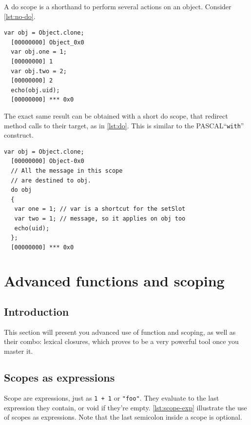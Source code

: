 \documentclass[openright,twoside,12pt]{report}
\newcommand{\pascal}{PASCAL\xspace}
\newcommand{\lst}[1]{\autoref{lst:#1}}
\begin{document}
A do scope is a shorthand to perform several actions on an
object. Consider \lst{no-do}.

\begin{lstlisting}[caption=Lot of code bloat,label=lst:no-do]
  var obj = Object.clone;
  [00000000] Object_0x0
  var obj.one = 1;
  [00000000] 1
  var obj.two = 2;
  [00000000] 2
  echo(obj.uid);
  [00000000] *** 0x0
\end{lstlisting}

The exact same result can be obtained with a short do scope, that
redirect method calls to their target, as in \lst{do}. This is similar
to the \pascal ``\texttt{with}'' construct.


\begin{lstlisting}[caption=Shorter with a do block,label=lst:do]
  var obj = Object.clone;
  [00000000] Object-0x0
  // All the message in this scope
  // are destined to obj.
  do obj
  {
   var one = 1; // var is a shortcut for the setSlot
   var two = 1; // message, so it applies on obj too
   echo(uid);
  };
  [00000000] *** 0x0
\end{lstlisting}



\chapter{Advanced functions and scoping}

\section{Introduction}

This section will present you advanced use of function and scoping, as
well as their combo: lexical closures, which proves to be a very
powerful tool once you master it.

\section{Scopes as expressions}

Scope are expressions, just as \lstinline|1 + 1| or \lstinline|"foo"|.
They evaluate to the last expression they contain, or void if they're
empty. \lst{scope-exp} illustrate the use of scopes as
expressions. Note that the last semicolon inside a scope is optional.
\end{document}
